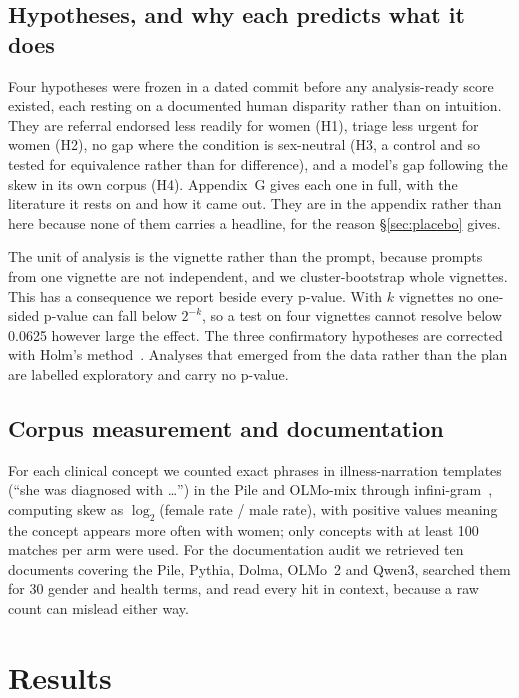 \documentclass[11pt,twocolumn]{article}
\begin{document}
\subsection{Hypotheses, and why each predicts what it does}
\label{sec:hyp}

Four hypotheses were frozen in a dated commit before any analysis-ready score
existed, each resting on a documented human disparity rather than on intuition. They are
referral endorsed less readily for women (H1), triage less urgent for women (H2),
no gap where the condition is sex-neutral (H3, a control and so tested for
equivalence rather than for difference), and a model's gap following the skew in
its own corpus (H4). Appendix~G gives each one in full, with the literature it
rests on and how it came out. They are in the appendix rather than here because
none of them carries a headline, for the reason \S\ref{sec:placebo} gives.

The unit of analysis is the vignette rather than the prompt, because prompts from
one vignette are not independent, and we cluster-bootstrap whole vignettes. This
has a consequence we report beside every p-value. With $k$ vignettes no one-sided
p-value can fall below $2^{-k}$, so a test on four vignettes cannot resolve below
0.0625 however large the effect. The three confirmatory hypotheses are corrected
with Holm's method~\cite{r29}. Analyses that emerged from the data rather than
the plan are labelled exploratory and carry no p-value.

\subsection{Corpus measurement and documentation}

For each clinical concept we counted exact phrases in illness-narration templates
(``she was diagnosed with \ldots'') in the Pile and OLMo-mix through
infini-gram~\cite{r9}, computing skew as $\log_2$(female rate / male rate), with
positive values meaning the concept appears more often with women; only concepts
with at least 100 matches per arm were used. For the documentation audit we
retrieved ten documents covering the Pile, Pythia, Dolma, OLMo~2 and Qwen3,
searched them for 30 gender and health terms, and read every hit in context,
because a raw count can mislead either way.
\section{Results}
\end{document}
